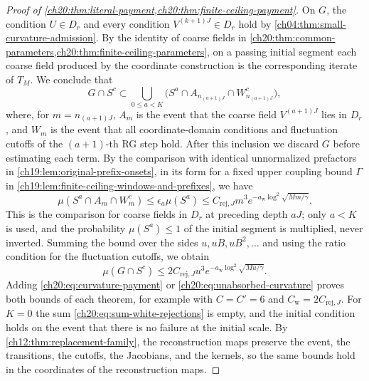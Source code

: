 \begin{proof}[Proof of \cref{ch20:thm:literal-payment,ch20:thm:finite-ceiling-payment}]
On $G$, the condition $U\in D_r$ and every condition $V^{(k+1)J}\in D_r$ hold by \cref{ch04:thm:small-curvature-admission}. By the identity of coarse fields in \cref{ch20:thm:common-parameters,ch20:thm:finite-ceiling-parameters}, on a passing initial segment each coarse field produced by the coordinate construction is the corresponding iterate of $T_M$. We conclude that
\begin{equation}\label{ch20:eq:first-rejection-inclusion}
 G\cap S^c\subset\bigcup_{0\le a<K}\bigl(S^a\cap A_{n_{(a+1)J}}\cap W_{n_{(a+1)J}}^c\bigr),
\end{equation}
where, for $m=n_{(a+1)J}$, $A_m$ is the event that the coarse field $V^{(a+1)J}$ lies in $D_r$, and $W_m$ is the event that all coordinate-domain conditions and fluctuation cutoffs of the $(a+1)$-th RG step hold. After this inclusion we discard $G$ before estimating each term. By the comparison with identical unnormalized prefactors in \cref{ch19:lem:original-prefix-onsets}, in its form for a fixed upper coupling bound $\Gamma$ in \cref{ch19:lem:finite-ceiling-windows-and-prefixes}, we have
\begin{equation}\label{ch20:eq:one-macro-rejection}
 \mu(S^a\cap A_m\cap W_m^c)\le\epsilon_a\mu(S^a)\le C_{\mathrm{rej},J}m^3e^{-a_{\mathrm w}\log^2\sqrt{Mm/\gamma}}.
\end{equation}
This is the comparison for coarse fields in $D_r$ at preceding depth $aJ$; only $a<K$ is used, and the probability $\mu(S^a)\le1$ of the initial segment is multiplied, never inverted. Summing the bound over the sides $u,uB,uB^2,\dots$ and using the ratio condition for the fluctuation cutoffs, we obtain
\begin{equation}\label{ch20:eq:sum-white-rejections}
 \mu(G\cap S^c)\le2C_{\mathrm{rej},J}u^3e^{-a_{\mathrm w}\log^2\sqrt{Mu/\gamma}}.
\end{equation}
Adding \eqref{ch20:eq:curvature-payment} or \eqref{ch20:eq:unabsorbed-curvature} proves both bounds of each theorem, for example with $C=C'=6$ and $C_{\mathrm w}=2C_{\mathrm{rej},J}$. For $K=0$ the sum \eqref{ch20:eq:sum-white-rejections} is empty, and the initial condition holds on the event that there is no failure at the initial scale. By \cref{ch12:thm:replacement-family}, the reconstruction maps preserve the event, the transitions, the cutoffs, the Jacobians, and the kernels, so the same bounds hold in the coordinates of the reconstruction maps.


\end{proof}
